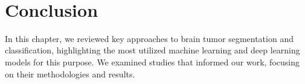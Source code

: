 \newpage\
\section{Conclusion}
In this chapter, we reviewed key approaches to brain tumor segmentation and classification, highlighting the most utilized machine learning and deep learning models for this purpose. We examined studies that informed our work, focusing on their methodologies and results.
